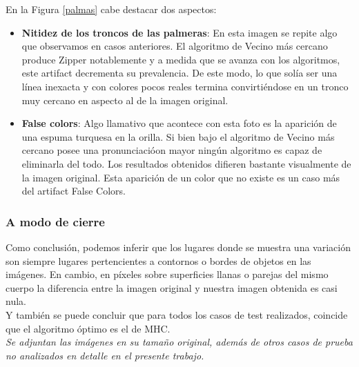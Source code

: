 \documentclass[a4paper]{article}
\begin{document}
\newpage

En la Figura \ref{palmas} cabe destacar dos aspectos:

\begin{itemize}
\item \textbf{Nitidez de los troncos de las palmeras}: En esta imagen se repite algo que observamos en casos anteriores. El algoritmo de Vecino m\'as cercano produce Zipper notablemente y a medida que se avanza con los algoritmos, este artifact decrementa su prevalencia. De este modo, lo que sol\'ia ser una l\'inea inexacta y con colores pocos reales termina convirti\'endose en un tronco muy cercano en aspecto al de la imagen original. 
\item \textbf{False colors}: Algo llamativo que acontece con esta foto es la aparici\'on de una espuma turquesa en la orilla. Si bien bajo el algoritmo de Vecino m\'as cercano posee una pronunciaci\'oon mayor ning\'un algoritmo es capaz de eliminarla del todo. Los resultados obtenidos difieren bastante visualmente de la imagen original. Esta aparici\'on de un color que no existe es un caso m\'as del artifact False Colors.
\end{itemize}

\subsubsection*{A modo de cierre}
Como conclusi\'on, podemos inferir que los lugares donde se muestra una variaci\'on son siempre lugares pertencientes a contornos o bordes de objetos en las im\'agenes. En cambio, en p\'ixeles sobre superficies llanas o parejas del mismo cuerpo la diferencia entre la imagen original y nuestra imagen obtenida es casi nula.\\

Y tambi\'en se puede concluir que para todos los casos de test realizados, coincide que el algoritmo \'optimo es el de MHC.\\

\textit{Se adjuntan las im\'agenes en su tama\~no original, además de otros casos de prueba no analizados en detalle en el presente trabajo.}
\end{document}
